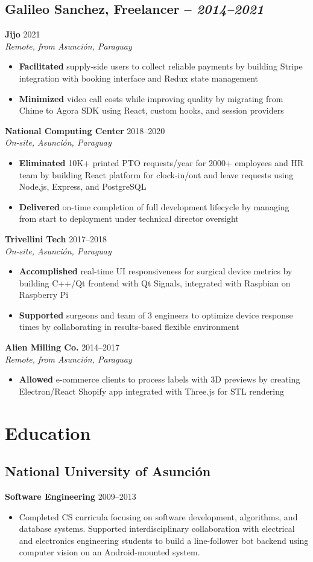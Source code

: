 \documentclass[11pt,a4paper]{article}
\newcommand{\actionverb}[1]{\textcolor{actioncolor}{\textbf{#1}}}
\newcommand{\cvcompany}[3]{
  \subsection{#1 \textcolor{mediumgray}{#2}}
  #3
}
\newcommand{\cvrole}[4]{
  \textbf{#1} \hfill \textcolor{mediumgray}{\small #2}\\
  \textit{#3}
  \begin{itemize}
    #4
  \end{itemize}
  \vspace{1em}
}
\newcommand{\cveducation}[4]{
  \subsection{#1}
  \textbf{#2} \hfill \textcolor{mediumgray}{\small #3}
  \begin{itemize}
    \item #4
  \end{itemize}
}
\begin{document}
\cvcompany{Galileo Sanchez, Freelancer}{-- \textit{2014--2021}}{
  \cvrole{Jijo}{2021}{Remote, from Asunción, Paraguay}{
    \item \actionverb{Facilitated} supply-side users to collect reliable payments by building Stripe integration with booking interface and Redux state management
    \item \actionverb{Minimized} video call costs while improving quality by migrating from Chime to Agora SDK using React, custom hooks, and session providers
  }
  
  \cvrole{National Computing Center}{2018--2020}{On-site, Asunción, Paraguay}{
    \item \actionverb{Eliminated} 10K+ printed PTO requests/year for 2000+ employees and HR team  by building React platform for clock-in/out and leave requests using Node.js, Express, and PostgreSQL
    \item \actionverb{Delivered} on-time completion of full development lifecycle by managing from start to deployment under technical director oversight
  }
  
  \cvrole{Trivellini Tech}{2017--2018}{On-site, Asunción, Paraguay}{
    \item \actionverb{Accomplished} real-time UI responsiveness for surgical device metrics by building C++/Qt frontend with Qt Signals, integrated with Raspbian on Raspberry Pi
    \item \actionverb{Supported} surgeons and team of 3 engineers to optimize device response times by collaborating in results-based flexible environment
  }
  
  \cvrole{Alien Milling Co.}{2014--2017}{Remote, from Asunción, Paraguay}{
    \item \actionverb{Allowed} e-commerce clients to process labels with 3D previews by creating Electron/React Shopify app integrated with Three.js for STL rendering
  }
}

\section{Education}

\cveducation{National University of Asunción}{Software Engineering}{2009--2013}{Completed CS curricula focusing on software development, algorithms, and database systems. Supported interdisciplinary collaboration with electrical and electronics engineering students to build a line-follower bot backend using computer vision on an Android-mounted system.}
\end{document}
